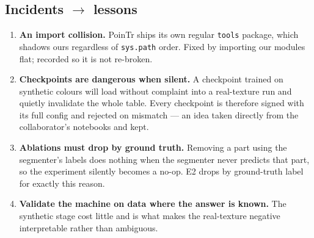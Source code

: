 \documentclass[11pt]{article}
\begin{document}
\subsection*{Incidents $\rightarrow$ lessons}
\begin{enumerate}
  \item \textbf{An import collision.} PoinTr ships its own regular \texttt{tools} package,
  which shadows ours regardless of \texttt{sys.path} order. Fixed by importing our modules
  flat; recorded so it is not re-broken.
  \item \textbf{Checkpoints are dangerous when silent.} A checkpoint trained on synthetic
  colours will load without complaint into a real-texture run and quietly invalidate the whole
  table. Every checkpoint is therefore signed with its full config and rejected on mismatch ---
  an idea taken directly from the collaborator's notebooks and kept.
  \item \textbf{Ablations must drop by ground truth.} Removing a part using the segmenter's
  labels does nothing when the segmenter never predicts that part, so the experiment silently
  becomes a no-op. E2 drops by ground-truth label for exactly this reason.
  \item \textbf{Validate the machine on data where the answer is known.} The synthetic stage
  cost little and is what makes the real-texture negative interpretable rather than ambiguous.
\end{enumerate}
\end{document}
